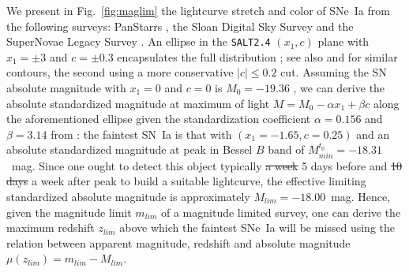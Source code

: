 \documentclass[]{aa} %
\newcommand{\nn}[1]{{\textcolor[rgb]{0.25, 0.50, 0}{#1}}}
\begin{document}
We present in Fig.~\ref{fig:maglim} the lightcurve stretch and color of SNe~Ia
from the following surveys: PanStarrs \citep[PS1][]{rest2014}, the Sloan Digital
Sky Survey \citep[SDSS][]{frieman2008} and the SuperNovae Legacy Survey
\citep[SNLS][]{astier2006}. An ellipse in the \textsc{\texttt{SALT2.4}} $(x_1,
c)$ plane with $x_1 = \pm 3$ and $c = \pm 0.3$ encapsulates the full
distribution \citep{guy2007,betoule2014}; see also \citet{bazin2011} and
\citet{campbell2013} for similar contours, the second using a more conservative
$|c| \leq 0.2$ cut.  Assuming the SN absolute magnitude with $x_1=0$ and $c=0$
is $M_0=-19.36$ \citep{kessler2009,scolnic2014}, we can derive the absolute
standardized magnitude at maximum of light $M = M_0 - \alpha x_1 + \beta c$
along the aforementioned ellipse given the standardization coefficient
$\alpha=0.156$ and $\beta=3.14$ from \cite{scolnic2018a}: the faintest SN~Ia is
that with $(x_1=-1.65, c=0.25)$ and an absolute standardized magnitude at peak
in Bessel $B$ band of $M^{t_0}_{min} = -18.31$~mag. Since one ought to detect
this object typically \nn{\sout{a week} 5 days before and \sout{10 days} a week}
after peak to build a suitable lightcurve, the effective limiting standardized
absolute magnitude is approximately $M_{lim} = -18.00$~mag. Hence, given the
magnitude limit $m_{lim}$ of a magnitude limited survey, one can derive the
maximum redshift $z_{lim}$ above which the faintest SNe~Ia will be missed using
the relation between apparent magnitude, redshift and absolute magnitude
$\mu(z_{lim}) = m_{lim} - M_{lim}$.
\end{document}
